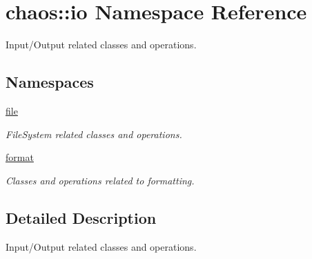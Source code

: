 \hypertarget{namespacechaos_1_1io}{}\section{chaos\+:\+:io Namespace Reference}
\label{namespacechaos_1_1io}


Input/\+Output related classes and operations.  


\subsection*{Namespaces}
\begin{DoxyCompactItemize}
\item 
 \hyperlink{namespacechaos_1_1io_1_1file}{file}
\begin{DoxyCompactList}\small\item\em File\+System related classes and operations. \end{DoxyCompactList}\item 
 \hyperlink{namespacechaos_1_1io_1_1format}{format}
\begin{DoxyCompactList}\small\item\em Classes and operations related to formatting. \end{DoxyCompactList}\end{DoxyCompactItemize}


\subsection{Detailed Description}
Input/\+Output related classes and operations. 